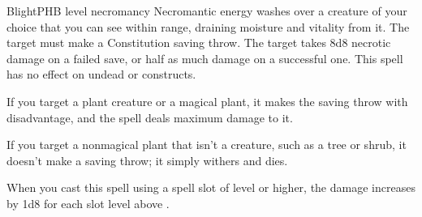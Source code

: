 \begin{spell}{Blight}{PHB}{ level necromancy}
{
}
Necromantic energy washes over a creature of your
choice that you can see within range, draining moisture
and vitality from it. The target must make a Constitution
saving throw. The target takes 8d8 necrotic damage on
a failed save, or half as much damage on a successful
one. This spell has no effect on undead or constructs.

If you target a plant creature or a magical plant, it
makes the saving throw with disadvantage, and the spell
deals maximum damage to it.

If you target a nonmagical plant that isn't a creature,
such as a tree or shrub, it doesn't make a saving throw;
it simply withers and dies.

 When you cast this spell using a
spell slot of  level or higher, the damage increases by
1d8 for each slot level above .
\end{spell}